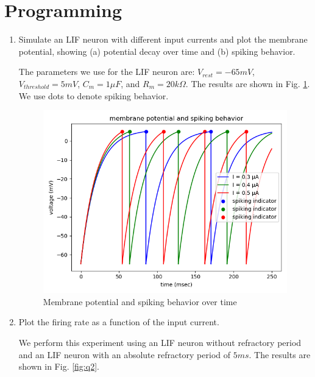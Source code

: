 \documentclass[11pt]{article}
\begin{document}
	\section*{Programming}
	\begin{enumerate}
		\item Simulate an LIF neuron with different input currents and plot the membrane potential, showing (a) potential decay over time and (b) spiking behavior.

		The parameters we use for the LIF neuron are: $V_{rest} = -65 mV$, $V_{threshold} = 5 mV$, $C_m = 1 \mu F$, and $R_m = 20 k\Omega$. The results are shown in Fig. \ref{fig:q1-voltage}. We use dots to denote spiking behavior.
		
		\begin{figure}[htb]
			\centering
			\includegraphics[width=.5\textwidth]{plot_programming_1.png}
			\caption{\label{fig:q1-voltage} Membrane potential and spiking behavior over time}
		\end{figure}
		
		\item Plot the firing rate as a function of the input current.
		
		We perform this experiment using an LIF neuron without refractory period and an LIF neuron with an absolute refractory period of $5 ms$.
		The results are shown in Fig. \ref{fig:q2}.
		

\end{enumerate}
\end{document}
